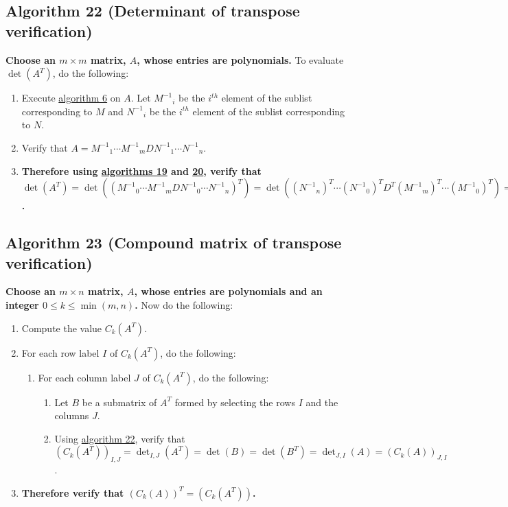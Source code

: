 \documentclass[twocolumn]{article}
\begin{document}
		\subsection{Algorithm 22 (Determinant of transpose verification)}\label{sec:algorithm 22}
			\textbf{Choose an $m\times m$ matrix, $A$, whose entries are polynomials.} To evaluate $\det(A^T)$, do the following:
			\begin{enumerate}
				\item Execute \hyperref[sec:algorithm 6]{algorithm 6} on $A$. Let ${M^{-1}}_i$ be the $i^{th}$ element of the sublist corresponding to $M$ and ${N^{-1}}_i$ be the $i^{th}$ element of the sublist corresponding to $N$.
				\item Verify that $A={M^{-1}}_1\cdots {M^{-1}}_mD{N^{-1}}_1\cdots {N^{-1}}_n$.
				\item \textbf{Therefore using \hyperref[sec:algorithm 19]{algorithms 19} and \hyperref[sec:algorithm 20]{20}, verify that $\det(A^T)=\det(({M^{-1}}_0\cdots {M^{-1}}_mD{N^{-1}}_0\cdots {N^{-1}}_n)^T)=\det(({N^{-1}}_n)^T\cdots({N^{-1}}_0)^TD^T({M^{-1}}_m)^T\cdots({M^{-1}}_0)^T)=\det(D^T)=\det(D)=\det({M^{-1}}_1\cdots {M^{-1}}_mD{N^{-1}}_1\cdots {N^{-1}}_n)=\det(A)$.}
			\end{enumerate}
		\subsection{Algorithm 23 (Compound matrix of transpose verification)}\label{sec:algorithm 23}
			\textbf{Choose an $m\times n$ matrix, $A$, whose entries are polynomials and an integer $0\le k\le\min(m,n)$.} Now do the following:
			\begin{enumerate}
				\item Compute the value $C_k(A^T)$.
				\item For each row label $I$ of $C_k(A^T)$, do the following:
				\begin{enumerate}
					\item For each column label $J$ of $C_k(A^T)$, do the following:
					\begin{enumerate}
						\item Let $B$ be a submatrix of $A^T$ formed by selecting the rows $I$ and the columns $J$.
						\item Using \hyperref[sec:algorithm 22]{algorithm 22}, verify that $(C_k(A^T))_{I,J}=\det_{I,J}(A^T)=\det(B)=\det(B^T)=\det_{J,I}(A)=(C_k(A))_{J,I}$.
					\end{enumerate}
				\end{enumerate}
				\item \textbf{Therefore verify that $(C_k(A))^T=(C_k(A^T))$.}
			\end{enumerate}
\end{document}
